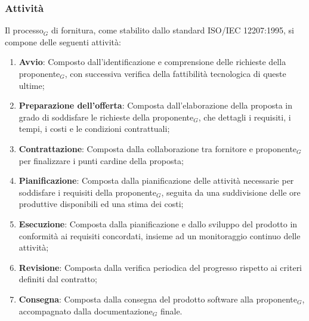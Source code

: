 \documentclass[10pt]{article}
\begin{document}
\begin{justify}
    \subsubsection{Attività}
    Il processo$_G$ di fornitura, come stabilito dallo standard ISO/IEC 12207:1995, si compone delle seguenti attività:
    \begin{enumerate}
        \item \textbf{Avvio}: Composto dall'identificazione e comprensione delle richieste della proponente$_G$, con successiva verifica della fattibilità tecnologica di queste ultime;
        \item \textbf{Preparazione dell'offerta}: Composta dall'elaborazione della proposta in grado di soddisfare le richieste della proponente$_G$, che dettagli i requisiti, i tempi, i costi e le condizioni contrattuali;
        \item \textbf{Contrattazione}: Composta dalla collaborazione tra fornitore e proponente$_G$ per finalizzare i punti cardine della proposta;
        \item \textbf{Pianificazione}: Composta dalla pianificazione delle attività necessarie per soddisfare i requisiti della proponente$_G$, seguita da una suddivisione delle ore produttive disponibili ed una stima dei costi;
        \item \textbf{Esecuzione}: Composta dalla pianificazione e dallo sviluppo del prodotto in conformità ai requisiti concordati, insieme ad un monitoraggio continuo delle attività;
        \item \textbf{Revisione}: Composta dalla verifica periodica del progresso rispetto ai criteri definiti dal contratto;
        \item \textbf{Consegna}: Composta dalla consegna del prodotto software alla proponente$_G$, accompagnato dalla documentazione$_G$ finale.
    \end{enumerate}


\end{justify}
\end{document}
